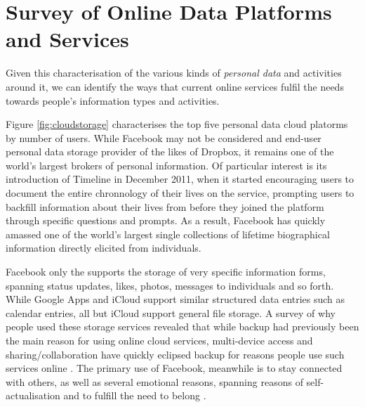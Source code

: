 \documentclass[graybox]{svmult}
\begin{document}
\section{Survey of Online Data Platforms and Services}

Given this characterisation of the various kinds of \emph{personal data} and activities around it, we can identify the ways that current online services fulfil the needs towards people's information types and activities.

Figure \ref{fig:cloudstorage} characterises the top five personal data cloud platorms by number of users. While Facebook may not be considered and end-user personal data storage provider of the likes of Dropbox, it remains one of the world's largest brokers of personal information.  Of particular interest is its introduction of Timeline in December 2011, when it started encouraging users to document the entire chronnology of their lives on the service, prompting users to backfill information about their lives from before they joined the platform through specific questions and prompts.  As a result, Facebook has quickly amassed one of the world's largest single collections of lifetime biographical information directly elicited from individuals.

Facebook only the supports the storage of very specific information forms, spanning status updates, likes, photos, messages to individuals and so forth.  While Google Apps and iCloud support similar structured data entries such as calendar entries, all but iCloud support general file storage.  A survey of why people used these storage services revealed that while backup had previously been the main reason for using online cloud services, multi-device access and sharing/collaboration have quickly eclipsed backup for reasons people use such services online \cite{listitstudy}. The primary use of Facebook, meanwhile is to stay connected with others, as well as several emotional reasons, spanning reasons of self-actualisation and to fulfill the need to belong \cite{why-do-people-facebook}.
\end{document}
